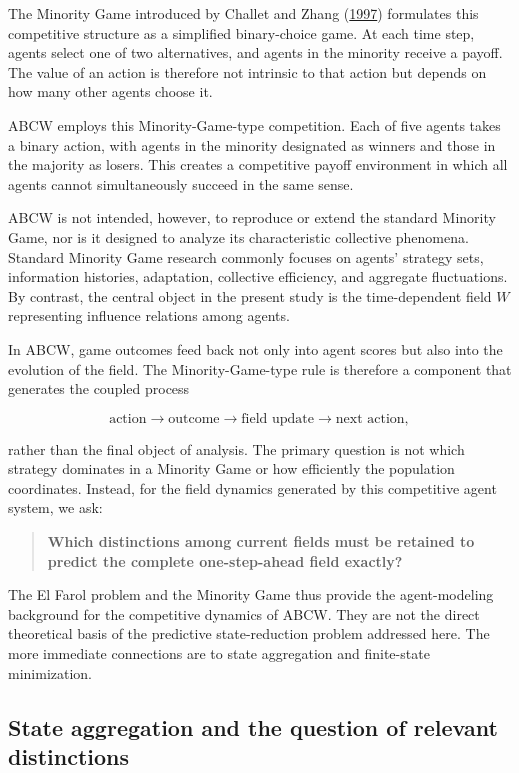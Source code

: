 \documentclass[
  11pt,
]{article}
\begin{document}
The Minority Game introduced by Challet and Zhang
(\protect\hyperlink{ref-challet1997}{1997}) formulates this competitive
structure as a simplified binary-choice game. At each time step, agents
select one of two alternatives, and agents in the minority receive a
payoff. The value of an action is therefore not intrinsic to that action
but depends on how many other agents choose it.

ABCW employs this Minority-Game-type competition. Each of five agents
takes a binary action, with agents in the minority designated as winners
and those in the majority as losers. This creates a competitive payoff
environment in which all agents cannot simultaneously succeed in the
same sense.

ABCW is not intended, however, to reproduce or extend the standard
Minority Game, nor is it designed to analyze its characteristic
collective phenomena. Standard Minority Game research commonly focuses
on agents' strategy sets, information histories, adaptation, collective
efficiency, and aggregate fluctuations. By contrast, the central object
in the present study is the time-dependent field \({W}\) representing
influence relations among agents.

In ABCW, game outcomes feed back not only into agent scores but also
into the evolution of the field. The Minority-Game-type rule is
therefore a component that generates the coupled process

\[{\text{action}\longrightarrow\text{outcome}\longrightarrow\text{field update}\longrightarrow\text{next action},}\]

rather than the final object of analysis. The primary question is not
which strategy dominates in a Minority Game or how efficiently the
population coordinates. Instead, for the field dynamics generated by
this competitive agent system, we ask:

\begin{quote}
\textbf{Which distinctions among current fields must be retained to
predict the complete one-step-ahead field exactly?}
\end{quote}

The El Farol problem and the Minority Game thus provide the
agent-modeling background for the competitive dynamics of ABCW. They are
not the direct theoretical basis of the predictive state-reduction
problem addressed here. The more immediate connections are to state
aggregation and finite-state minimization.

\hypertarget{state-aggregation-and-the-question-of-relevant-distinctions}{%
\subsection{State aggregation and the question of relevant
distinctions}\label{state-aggregation-and-the-question-of-relevant-distinctions}}
\end{document}
